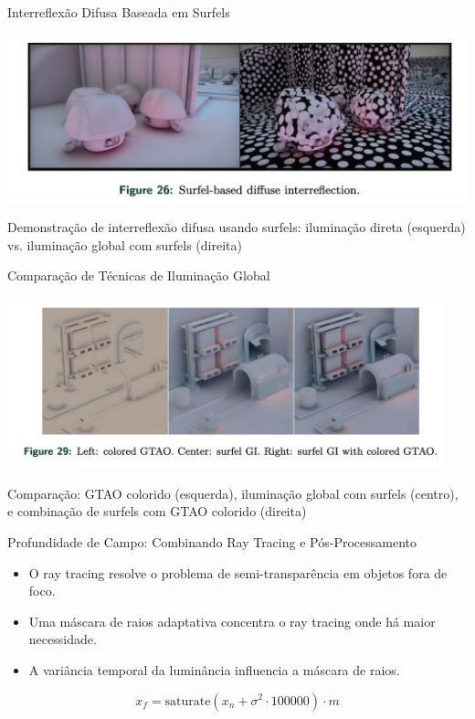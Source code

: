 \documentclass[aspectratio=169,xcolor=table]{beamer}
\begin{document}
\begin{frame}{Interreflexão Difusa Baseada em Surfels}
    \begin{center}
        \includegraphics[height=0.7\textheight]{surfel-based-diffuse-interreflection}
    \end{center}
    \begin{center}
        \small{Demonstração de interreflexão difusa usando surfels: iluminação direta (esquerda) vs. iluminação global com surfels (direita)}
    \end{center}
\end{frame}

\begin{frame}{Comparação de Técnicas de Iluminação Global}
    \begin{center}
        \includegraphics[width=0.95\textwidth]{surfel-comparacao}
    \end{center}
    \begin{center}
        \small{Comparação: GTAO colorido (esquerda), iluminação global com surfels (centro),\\
        e combinação de surfels com GTAO colorido (direita)}
    \end{center}
\end{frame}

\begin{frame}{Profundidade de Campo: Combinando Ray Tracing e Pós-Processamento}
    \begin{itemize}
        \item O ray tracing resolve o problema de semi-transparência em objetos fora de foco.
        \item Uma máscara de raios adaptativa concentra o ray tracing onde há maior necessidade.
        \item A variância temporal da luminância influencia a máscara de raios.
    \end{itemize}
    \begin{equation*}
        x_f = \text{saturate}(x_n + \sigma^2 \cdot 100000) \cdot m
    \end{equation*}
\end{frame}
\end{document}
